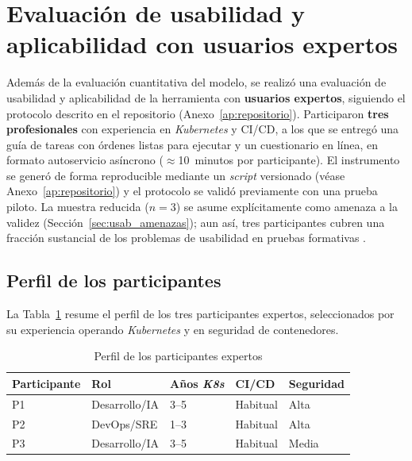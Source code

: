 \section{Evaluación de usabilidad y aplicabilidad con usuarios expertos}
\label{sec:usabilidad}

Además de la evaluación cuantitativa del modelo, se realizó una evaluación de
usabilidad y aplicabilidad de la herramienta con \textbf{usuarios expertos},
siguiendo el protocolo descrito en el repositorio (Anexo~\ref{ap:repositorio}).
Participaron \textbf{tres profesionales} con experiencia en \textit{Kubernetes} y
CI/CD, a los que se entregó una guía de tareas con órdenes listas para ejecutar y
un cuestionario en línea, en formato autoservicio asíncrono (\(\approx\)10~minutos
por participante). El instrumento se generó de forma reproducible mediante un
\textit{script} versionado (véase Anexo~\ref{ap:repositorio}) y el protocolo se
validó previamente con una prueba piloto. La muestra reducida (\(n=3\)) se asume
explícitamente como amenaza a la validez (Sección~\ref{sec:usab_amenazas}); aun
así, tres participantes cubren una fracción sustancial de los problemas de
usabilidad en pruebas formativas \citep{Nielsen2000}.

\subsection{Perfil de los participantes}

La Tabla~\ref{tab:usab_perfil} resume el perfil de los tres participantes expertos,
seleccionados por su experiencia operando \textit{Kubernetes} y en seguridad de
contenedores.

\begin{table}[htbp]
\centering
\caption{Perfil de los participantes expertos}
\label{tab:usab_perfil}
\begin{tabular}{@{}lllll@{}}
\toprule
Participante & Rol & Años \textit{K8s} & CI/CD & Seguridad \\
\midrule
P1 & Desarrollo/IA & 3--5 & Habitual & Alta \\
P2 & DevOps/SRE    & 1--3 & Habitual & Alta \\
P3 & Desarrollo/IA & 3--5 & Habitual & Media \\
\bottomrule
\end{tabular}
\fuentepropia
\end{table}

